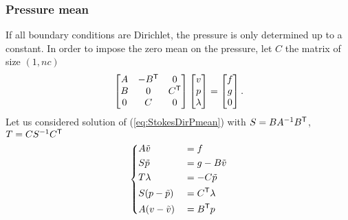 \subsubsection{Pressure mean}
%
If all boundary conditions are Dirichlet, the pressure is only determined up to a constant. In order to impose the zero mean on the pressure, let $C$ the matrix of size $(1,nc)$
%
\begin{equation}\label{eq:StokesDirPmean}
\begin{bmatrix}
A  & -{B}^{\mathsf{T}}& 0\\
B & 0 & {C}^{\mathsf{T}}\\
0 & C & 0
\end{bmatrix}
\begin{bmatrix}
v\\
p\\
\lambda
\end{bmatrix}
=
\begin{bmatrix}
f\\
g\\
0
\end{bmatrix}.
\end{equation}
%
Let us considered solution of (\ref{eq:StokesDirPmean}) with $S=BA^{-1}{B}^{\mathsf{T}}$, $T=CS^{-1}{C}^{\mathsf{T}}$
%
\begin{equation}\label{eq:}
%
\left\{
\begin{aligned}
&A \tilde v &&= f\\
&S \tilde p &&= g-B\tilde v\\
&T \lambda &&= -C\tilde p\\
&S (p-\tilde p) &&= \transpose{C} \lambda\\
&A(v-\tilde v) &&=  \transpose{B} p
\end{aligned}
\right.
%
\end{equation}
%
%
